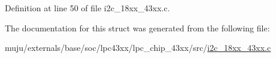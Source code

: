 Definition at line 50 of file i2c\+\_\+18xx\+\_\+43xx.\+c.



The documentation for this struct was generated from the following file\+:\begin{DoxyCompactItemize}
\item 
muju/externals/base/soc/lpc43xx/lpc\+\_\+chip\+\_\+43xx/src/\hyperlink{i2c__18xx__43xx_8c}{i2c\+\_\+18xx\+\_\+43xx.\+c}\end{DoxyCompactItemize}
